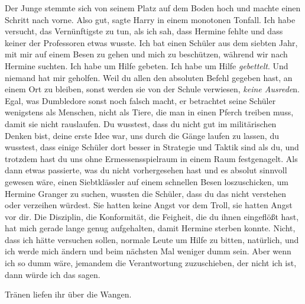 Der Junge stemmte sich von seinem Platz auf dem Boden hoch und machte einen
Schritt nach vorne. \glqq Also gut\grqq{}, sagte Harry in einem monotonen
Tonfall. \glqq Ich habe versucht, das Vernünftigste zu tun, als ich sah, dass
Hermine fehlte und dass keiner der Professoren etwas wusste. Ich bat einen
Schüler aus dem siebten Jahr, mit mir auf einem Besen zu gehen und mich zu
beschützen, während wir nach Hermine suchten. Ich habe um Hilfe gebeten. Ich
habe um Hilfe \emph{gebettelt}. Und niemand hat mir geholfen. Weil du allen den
absoluten Befehl gegeben hast, an einem Ort zu bleiben, sonst werden sie von der
Schule verwiesen, \emph{keine Ausrede}n. Egal, was Dumbledore sonst noch falsch
macht, er betrachtet seine Schüler wenigstens als Menschen, nicht als Tiere, die
man in einen Pferch treiben muss, damit sie nicht rauslaufen. Du wusstest, dass
du nicht gut im militärischen Denken bist, deine erste Idee war, uns durch die
Gänge laufen zu lassen, du wusstest, dass einige Schüler dort besser in
Strategie und Taktik sind als du, und trotzdem hast du uns ohne
Ermessensspielraum in einem Raum festgenagelt. Als dann etwas passierte, was du
nicht vorhergesehen hast und es absolut sinnvoll gewesen wäre, einen
Siebtklässler auf einem schnellen Besen loszuschicken, um Hermine Granger zu
suchen, wussten die Schüler, dass du das nicht verstehen oder verzeihen würdest.
Sie hatten keine Angst vor dem Troll, sie hatten Angst vor dir. Die Disziplin,
die Konformität, die Feigheit, die du ihnen eingeflößt hast, hat mich gerade
lange genug aufgehalten, damit Hermine sterben konnte. Nicht, dass ich hätte
versuchen sollen, normale Leute um Hilfe zu bitten, natürlich, und ich werde
mich ändern und beim nächsten Mal weniger dumm sein. Aber wenn ich so dumm wäre,
jemandem die Verantwortung zuzuschieben, der nicht ich ist, dann würde ich das
sagen.\grqq{}

Tränen liefen ihr über die Wangen.

